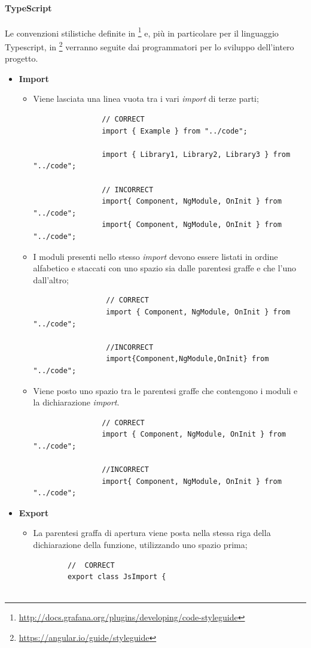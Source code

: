 \paragraph{TypeScript}\Spazio
Le convenzioni stilistiche definite in \footnote{\url{http://docs.grafana.org/plugins/developing/code-styleguide}} e, più in particolare per il linguaggio Typescript, in \footnote{\url{https://angular.io/guide/styleguide}} verranno seguite dai programmatori per lo sviluppo dell'intero progetto.

\begin{itemize}
	\item{\textbf{Import}}
		\begin{itemize}
			\item{Viene lasciata una linea vuota tra i vari \emph{import} di terze parti;}
				\begin{lstlisting}
				// CORRECT
				import { Example } from "../code";  
				
				import { Library1, Library2, Library3 } from "../code";
				
				// INCORRECT
				import{ Component, NgModule, OnInit } from "../code";  
				import{ Component, NgModule, OnInit } from "../code";
				\end{lstlisting}
			
			\item{I moduli presenti nello stesso \emph{import} devono essere listati in
			ordine alfabetico e staccati con uno spazio sia dalle parentesi graffe e che l'uno dall'altro;}
				 \begin{lstlisting}
				 // CORRECT
				 import { Component, NgModule, OnInit } from "../code";  
				 
				 //INCORRECT
				 import{Component,NgModule,OnInit} from "../code";  
				 \end{lstlisting}
			\item{Viene posto uno spazio tra le parentesi graffe che contengono i moduli e la dichiarazione \emph{import}.}
				\begin{lstlisting}
				// CORRECT
				import { Component, NgModule, OnInit } from "../code";  
				
				//INCORRECT
				import{ Component, NgModule, OnInit } from "../code";  
				\end{lstlisting}
		\end{itemize} 
	
	\item{\textbf{Export}} 
		\begin{itemize}
		\item{La parentesi graffa di apertura viene posta nella stessa riga della dichiarazione della funzione, utilizzando uno spazio prima;}
		\begin{lstlisting}
		//  CORRECT
		export class JsImport {  
		

\end{lstlisting}
\end{itemize}
\end{itemize}

